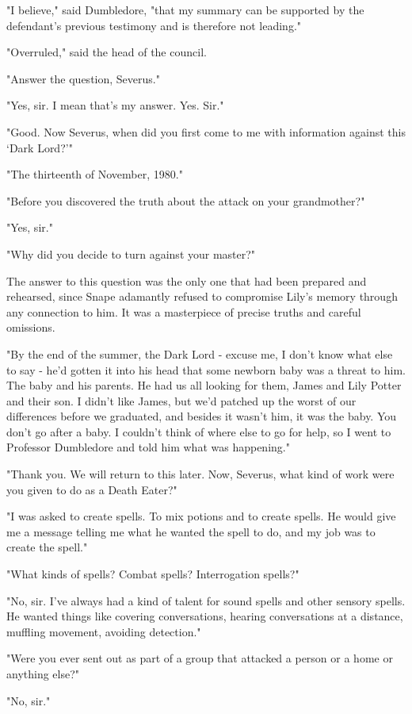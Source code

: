 "I believe," said Dumbledore, "that my summary can be supported by the defendant's previous testimony and is therefore not leading."

"Overruled," said the head of the council.

"Answer the question, Severus."

"Yes, sir. I mean that's my answer. Yes. Sir."

"Good. Now Severus, when did you first come to me with information against this `Dark Lord?'"

"The thirteenth of November, 1980."

"Before you discovered the truth about the attack on your grandmother?"

"Yes, sir."

"Why did you decide to turn against your master?"

The answer to this question was the only one that had been prepared and rehearsed, since Snape adamantly refused to compromise Lily's memory through any connection to him. It was a masterpiece of precise truths and careful omissions.

"By the end of the summer, the Dark Lord - excuse me, I don't know what else to say - he'd gotten it into his head that some newborn baby was a threat to him. The baby and his parents. He had us all looking for them, James and Lily Potter and their son. I didn't like James, but we'd patched up the worst of our differences before we graduated, and besides it wasn't him, it was the baby. You don't go after a baby. I couldn't think of where else to go for help, so I went to Professor Dumbledore and told him what was happening."

"Thank you. We will return to this later. Now, Severus, what kind of work were you given to do as a Death Eater?"

"I was asked to create spells. To mix potions and to create spells. He would give me a message telling me what he wanted the spell to do, and my job was to create the spell."

"What kinds of spells? Combat spells? Interrogation spells?"

"No, sir. I've always had a{\el} kind of talent for sound spells and other sensory spells. He wanted things like covering conversations, hearing conversations at a distance, muffling movement, avoiding detection."

"Were you ever sent out as part of a group that attacked a person or a home or anything else?"

"No, sir."

